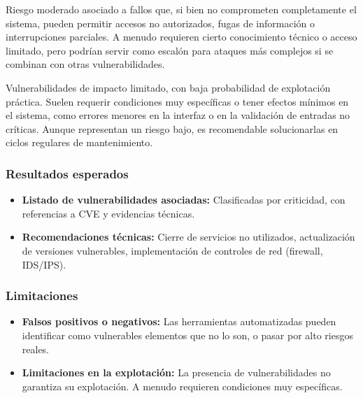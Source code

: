 \documentclass[a4paper, 11pt]{article}
\begin{document}
\begin{tcolorbox}[colback=cvssmedium!10, colframe=cvssmedium!80!black, coltitle=white,
    title=Media (CVSS 4.0 -- 6.9)]
Riesgo moderado asociado a fallos que, si bien no comprometen completamente el sistema, pueden permitir accesos no autorizados, fugas de información o interrupciones parciales. A menudo requieren cierto conocimiento técnico o acceso limitado, pero podrían servir como escalón para ataques más complejos si se combinan con otras vulnerabilidades.
\end{tcolorbox}

\vspace{0.2cm}

\begin{tcolorbox}[colback=cvsslow!10, colframe=cvsslow!80!black, coltitle=white,
    title=Baja (CVSS 0.1 -- 3.9)]
Vulnerabilidades de impacto limitado, con baja probabilidad de explotación práctica. Suelen requerir condiciones muy específicas o tener efectos mínimos en el sistema, como errores menores en la interfaz o en la validación de entradas no críticas. Aunque representan un riesgo bajo, es recomendable solucionarlas en ciclos regulares de mantenimiento.
\end{tcolorbox}



\vspace{0.5cm}
\subsubsection*{Resultados esperados}

\begin{itemize}
    \item \textbf{Listado de vulnerabilidades asociadas:} Clasificadas por criticidad, con referencias a CVE y evidencias técnicas.
    
    \item \textbf{Recomendaciones técnicas:} Cierre de servicios no utilizados, actualización de versiones vulnerables, implementación de controles de red (firewall, IDS/IPS).
\end{itemize}

\vspace{0.5cm}
\subsubsection*{Limitaciones}

\begin{itemize}
    \item \textbf{Falsos positivos o negativos:} Las herramientas automatizadas pueden identificar como vulnerables elementos que no lo son, o pasar por alto riesgos reales.
    
    \item \textbf{Limitaciones en la explotación:} La presencia de vulnerabilidades no garantiza su explotación. A menudo requieren condiciones muy específicas.
\end{itemize}
\end{document}
